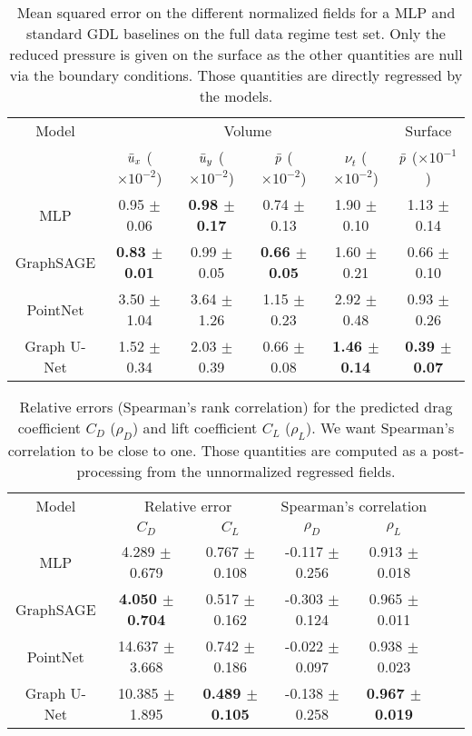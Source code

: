 \begin{table}
	\caption{Mean squared error on the different normalized fields for a MLP and standard GDL baselines on the full data regime test set. Only the reduced pressure is given on the surface as the other quantities are null via the boundary conditions. Those quantities are directly regressed by the models.}
	\label{tab:MSE}
	\centering
	\begin{tabular}{cccccc}
		\toprule
		Model & \multicolumn{4}{c}{Volume} & Surface  \\
		& $\Bar{u}_x$ ($\times 10^{-2}$) & $\Bar{u}_y$ ($\times 10^{-2}$) & $\Bar{p}$ ($\times 10^{-2}$) & $\nu_t$ ($\times 10^{-2}$) & $\Bar{p}$ ($\times 10^{-1}$) \\
		\midrule
		MLP & 0.95 $\pm$ 0.06 & \textbf{0.98 $\pm$ 0.17} & 0.74 $\pm$ 0.13 & 1.90 $\pm$ 0.10 & 1.13 $\pm$ 0.14 \\
		GraphSAGE & \textbf{0.83 $\pm$ 0.01} & 0.99 $\pm$ 0.05 & \textbf{0.66 $\pm$ 0.05} & 1.60 $\pm$ 0.21 & 0.66 $\pm$ 0.10 \\
		PointNet & 3.50 $\pm$ 1.04 & 3.64 $\pm$ 1.26 & 1.15 $\pm$ 0.23 & 2.92 $\pm$ 0.48 & 0.93 $\pm$ 0.26 \\
		Graph U-Net & 1.52 $\pm$ 0.34 & 2.03 $\pm$ 0.39 & 0.66 $\pm$ 0.08 & \textbf{1.46 $\pm$ 0.14} & \textbf{0.39 $\pm$ 0.07} \\
		\bottomrule
	\end{tabular}
\end{table}

\begin{table}
	\caption{Relative errors (Spearman's rank correlation) for the predicted drag coefficient $C_D$ ($\rho_D$) and lift coefficient $C_L$ ($\rho_L$). We want Spearman's correlation to be close to one. Those quantities are computed as a post-processing from the unnormalized regressed fields.}
	\label{tab:spear}
	\centering
	\begin{tabular}{ccccccc}
		\toprule
		Model & \multicolumn{2}{c}{Relative error} & \multicolumn{2}{c}{Spearman's correlation}  \\
		& $C_D$ & $C_L$ & $\rho_D$ & $\rho_L$ \\
		\midrule
		MLP & 4.289 $\pm$ 0.679 & 0.767 $\pm$ 0.108 & -0.117 $\pm$ 0.256 & 0.913 $\pm$ 0.018 \\
		GraphSAGE & \textbf{4.050 $\pm$ 0.704} & 0.517 $\pm$ 0.162 & -0.303 $\pm$ 0.124 & 0.965 $\pm$ 0.011 \\
		PointNet & 14.637 $\pm$ 3.668 & 0.742 $\pm$ 0.186 & -0.022 $\pm$ 0.097 & 0.938 $\pm$ 0.023 \\
		Graph U-Net & 10.385 $\pm$ 1.895 & \textbf{0.489 $\pm$ 0.105} & -0.138 $\pm$ 0.258 & \textbf{0.967 $\pm$ 0.019} \\
		\bottomrule
	\end{tabular}
\end{table}

